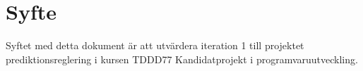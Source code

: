 \section{Syfte}
Syftet med detta dokument är att utvärdera iteration 1 till projektet prediktionsreglering i kursen TDDD77 Kandidatprojekt i programvaruutveckling. 